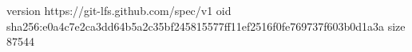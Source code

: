 version https://git-lfs.github.com/spec/v1
oid sha256:e0a4c7e2ca3dd64b5a2c35bf245815577ff11ef2516f0fe769737f603b0d1a3a
size 87544
